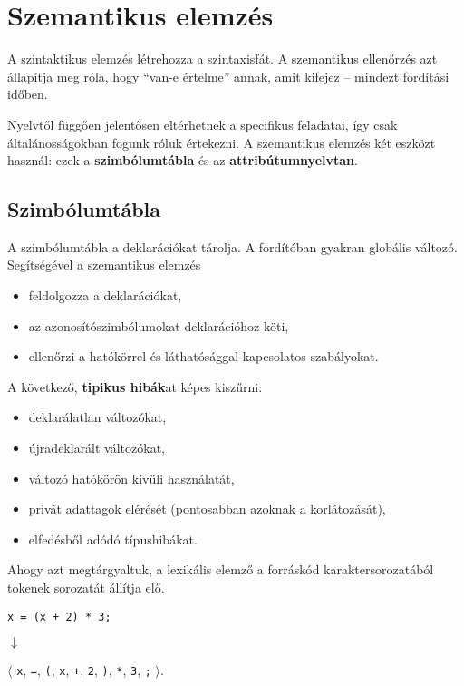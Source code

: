 \chapter{Szemantikus elemzés}

A szintaktikus elemzés létrehozza a szintaxisfát. A szemantikus ellenőrzés azt állapítja meg róla, hogy ``van-e értelme'' annak, amit kifejez -- mindezt fordítási időben.

Nyelvtől függően jelentősen eltérhetnek a specifikus feladatai, így csak általánosságokban fogunk róluk értekezni. A szemantikus elemzés két eszközt használ: ezek a \textbf{szimbólumtábla} és az \textbf{attribútumnyelvtan}.

\section{Szimbólumtábla}

A szimbólumtábla a deklarációkat tárolja. A fordítóban gyakran globális változó. Segítségével a szemantikus elemzés
\begin{itemize}
	\item feldolgozza a deklarációkat,
	\item az azonosítószimbólumokat deklarációhoz köti,
	\item ellenőrzi a hatókörrel és láthatósággal kapcsolatos szabályokat.
\end{itemize} 

A következő, \textbf{tipikus hibák}at képes kiszűrni:
\begin{itemize}
	\item deklarálatlan változókat,
	\item újradeklarált változókat,
	\item változó hatókörön kívüli használatát,
	\item privát adattagok elérését (pontosabban azoknak a korlátozását),
	\item elfedésből adódó típushibákat.
\end{itemize}

Ahogy azt megtárgyaltuk, a lexikális elemző a forráskód karaktersorozatából tokenek sorozatát állítja elő.
\begin{center}
	\texttt{x = (x + 2) * 3;}
	
	$\downarrow$
	
	$\langle$ \texttt{x}, \texttt{=}, \texttt{(}, \texttt{x}, \texttt{+}, \texttt{2}, \texttt{)}, \texttt{*}, \texttt{3}, \texttt{;} $\rangle$.
\end{center}

